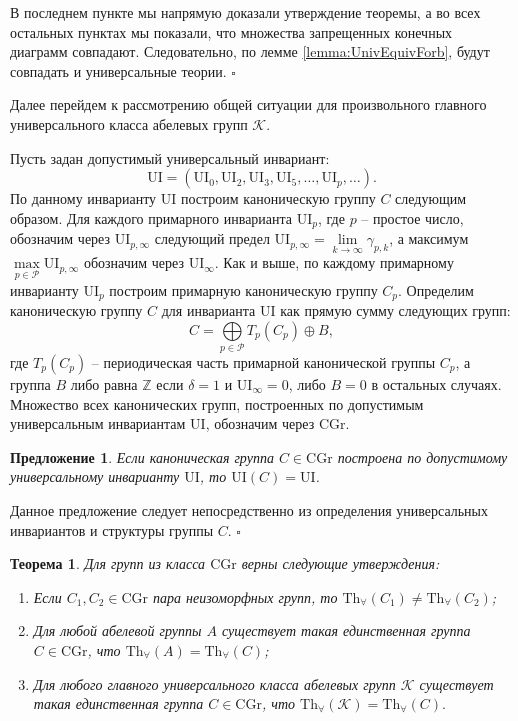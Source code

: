 \documentclass[a4paper,11pt,twoside]{article}
\newtheorem{theorem}{Теорема}[section]
\newtheorem{proposition}{Предложение}[section]
\def\proof{{\noindent{\bf Доказательство.}} }
\def\K{{\mathcal{K}}}
\def\P{{\mathcal{P}}}
\def\Z{{\mathbb{Z}}}
\def\Tha{{\mathrm{Th}_\forall}}
\def\CG{{\mathrm{CGr}}}
\def\ui{{\mathrm{UI}}}
\begin{document}
В последнем пункте мы напрямую доказали утверждение теоремы, а во всех остальных пунктах мы показали, что множества запрещенных конечных диаграмм совпадают. Следовательно, по лемме \ref{lemma:UnivEquivForb}, будут совпадать и универсальные теории. $\square$

Далее перейдем к рассмотрению общей ситуации для произвольного главного универсального класса абелевых групп $\K$.

Пусть задан допустимый универсальный инвариант:
$$\ui = (\ui_0, \ui_2, \ui_3, \ui_5, \ldots, \ui_p, \ldots).$$ 
По данному инварианту $\ui$ построим каноническую группу $C$ следующим образом. Для каждого примарного инварианта $\ui_p$, где $p$ -- простое число, обозначим через $\ui_{p,\infty}$ следующий предел $\ui_{p,\infty} = \lim\limits_{k \rightarrow \infty} \gamma_{p,k}$, а максимум $\max\limits_{p \in \P} \ui_{p, \infty}$ обозначим через $\ui_\infty$. Как и выше, по каждому примарному инварианту $\ui_p$ построим примарную каноническую группу $C_p$. Определим каноническую группу $C$ для инварианта $\ui$ как прямую сумму следующих групп:
$$C = \bigoplus\limits_{p \in \P} T_p(C_p) \oplus B,$$
где $T_p(C_p)$ -- периодическая часть примарной канонической группы $C_p$, а группа $B$ либо равна $\Z$ если $\delta = 1$ и $\ui_\infty = 0$, либо $B = 0$ в остальных случаях. Множество всех канонических групп, построенных по допустимым универсальным инвариантам $\ui$, обозначим через $\CG$.

\begin{proposition}\label{prop:UnivEnvForCannonicalGroup2}
Если каноническая группа $C \in \CG$ построена по допустимому универсальному инварианту $\ui$, то $\ui(C) = \ui$.
\end{proposition}
\proof Данное предложение следует непосредственно из определения универсальных инвариантов и структуры группы $C$. $\square$


\begin{theorem}\label{th:CannonicalGroupsAll}
Для групп из класса $\CG$ верны следующие утверждения:
\begin{enumerate}
\item Если $C_1, C_2 \in \CG$ пара неизоморфных групп, то $\Tha(C_1) \neq \Tha(C_2)$;
\item Для любой абелевой группы $A$ существует такая единственная группа $C \in \CG$, что $\Tha(A) = \Tha(C)$;
\item Для любого главного универсального класса абелевых групп $\K$ существует такая единственная группа $C \in \CG$, что $\Tha(\K) = \Tha(C).$
\end{enumerate}
\end{theorem}
\end{document}
